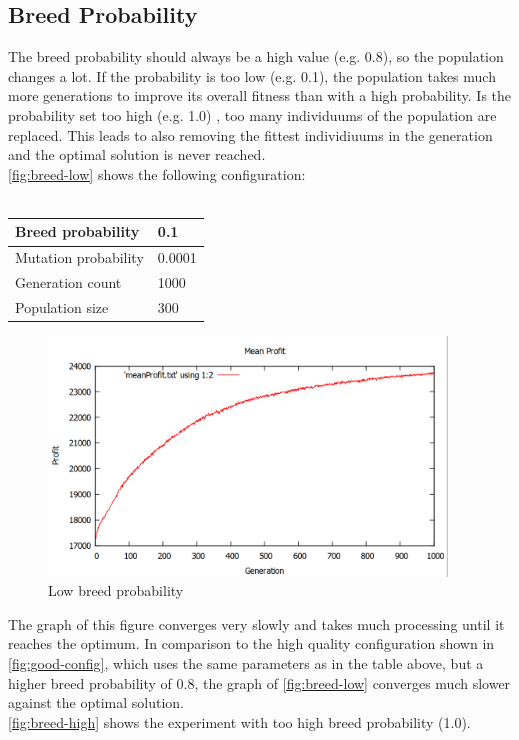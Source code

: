 \documentclass[fontsize=12pt,toc=bibliography, notitlepage]{scrreprt}
\begin{document}
\subsection{Breed Probability}
\label{subsec:breed-probability}
The breed probability should always be a high value (e.g. 0.8), so the population changes a lot. If the probability is too low (e.g. 0.1), the population takes much more generations to improve its overall fitness than with a high probability. Is the probability set too high (e.g. 1.0) , too many individuums of the population are replaced. This leads to also removing the fittest individiuums in the generation and the optimal solution is never reached.\\
\autoref{fig:breed-low} shows the following configuration:\\ \\
\begin{tabular}{ |l|l| }
	\hline
	Breed probability & 0.1 \\ \hline
	Mutation probability & 0.0001 \\ \hline
	Generation count & 1000 \\ \hline
	Population size & 300 \\ \hline
\end{tabular}
\begin{figure}[H]
	\centering
	\includegraphics[width=400px]{images/breed-low.png}
	\caption{Low breed probability}
	\label{fig:breed-low}
\end{figure}
The graph of this figure converges very slowly and takes much processing until it reaches the optimum. In comparison to the high quality configuration shown in \autoref{fig:good-config}, which uses the same parameters as in the table above, but a higher
breed probability of 0.8, the graph of \autoref{fig:breed-low} converges much slower against the optimal solution.\\
\autoref{fig:breed-high} shows the experiment with too high breed probability (1.0).
\end{document}
